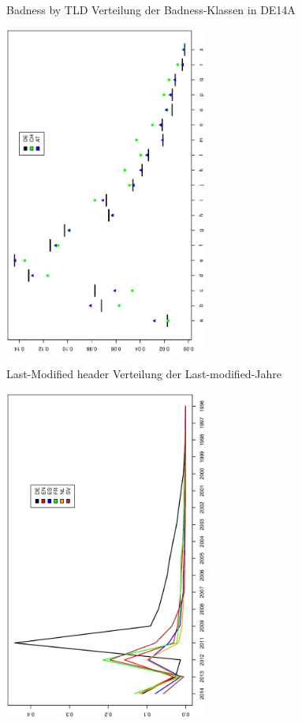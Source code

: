 \begin{frame}
  {Badness by TLD}
  Verteilung der Badness-Klassen in DE14A\\
  \begin{center}
    \includegraphics[width=0.5\textwidth,angle=270]{graphics/bdh}
  \end{center}
\end{frame}

\begin{frame}
  {Last-Modified header}
  Verteilung der Last-modified-Jahre\\
  \begin{center}
    \includegraphics[width=0.5\textwidth,angle=270]{graphics/lastmod}
  \end{center}
\end{frame}

